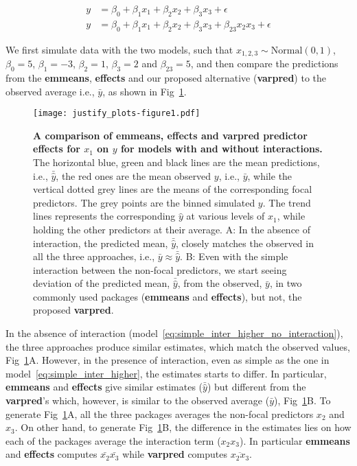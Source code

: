 \documentclass[10pt,letterpaper]{article}
\newcommand{\pkg}[1]{\textbf{#1}}
\let\over=\overline
\begin{document}
%
\begin{align}
y &= \beta_0 + \beta_1x_1 + \beta_2x_2 + \beta_3x_3 + \epsilon \label{eq:simple_inter_higher_no_interaction}\\
y &= \beta_0 + \beta_1x_1 + \beta_2x_2 + \beta_3x_3 + \beta_{23}x_2x_3 + \epsilon \label{eq:simple_inter_higher}
\end{align}
%

We first simulate data with the two models, such that $x_{1,2,3} \sim \mathrm{Normal}(0, 1)$, $\beta_0 = 5$, $\beta_1 = -3$, $\beta_2 = 1$, $\beta_3 = 2$ and $\beta_{23} = 5$, and then compare the predictions from the \pkg{emmeans}, \pkg{effects} and our proposed alternative (\pkg{varpred}) to the observed average i.e., $\bar{y}$, as shown in Fig~\ref{fig:justify_plots}.

\begin{figure}[!h]
\centering
\texttt{[image: justify\_plots-figure1.pdf]}
\caption{{\bf A comparison of \pkg{emmeans}, \pkg{effects} and \pkg{varpred} predictor effects for $x_1$ on $y$ for models with and without interactions.}
The horizontal blue, green and black lines are the mean predictions, i.e., $\bar{\hat{y}}$, the red ones are the mean observed $y$, i.e., $\bar{y}$, while the vertical dotted grey lines are the means of the corresponding focal predictors. The grey points are the binned simulated $y$. The trend lines represents the corresponding $\hat{y}$ at various levels of $x_1$, while holding the other predictors at their average. A: In the absence of interaction, the predicted mean, $\bar{\hat{y}}$, closely matches the observed in all the three approaches, i.e., $\bar{y} \approx \bar{\hat{y}}$. B: Even with the simple interaction between the non-focal predictors, we start seeing deviation of the predicted mean, $\bar{\hat{y}}$, from the observed, $\bar{y}$, in two commonly used packages (\pkg{emmeans} and \pkg{effects}), but not, the proposed \pkg{varpred}.}
\label{fig:justify_plots}
\end{figure}

In the absence of interaction (model~\ref{eq:simple_inter_higher_no_interaction}), the three approaches produce similar estimates, which match the observed values, Fig~\ref{fig:justify_plots}A. However, in the presence of interaction, even as simple as the one in model~\ref{eq:simple_inter_higher}, the estimates starts to differ. In particular, \pkg{emmeans} and \pkg{effects} give similar estimates ($\bar{\hat{y}}$) but different from the \pkg{varpred}'s which, however, is similar to the observed average ($\bar{y}$), Fig~\ref{fig:justify_plots}B. To generate Fig~\ref{fig:justify_plots}A, all the three packages averages the non-focal predictors $x_2$ and $x_3$. On other hand, to generate Fig~\ref{fig:justify_plots}B, the difference in the estimates lies on how each of the packages average the interaction term ($x_2x_3$). In particular \pkg{emmeans} and \pkg{effects} computes $\bar{x_2}\bar{x_3}$ while \pkg{varpred} computes $\over{x_2x_3}$.
\end{document}
